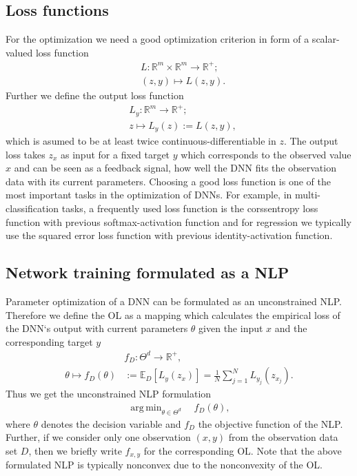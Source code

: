\documentclass[conference]{IEEEtran}
\DeclareMathOperator*{\argmin}{arg\,min}
\begin{document}
\subsection{Loss functions}
For the optimization we need a good optimization criterion in form of a scalar-valued loss function
\begin{align}
&L:\mathbb{R}^{m}\times \mathbb{R}^{m}\rightarrow \mathbb{R}^{+};\\
&(z, y)\mapsto L(z, y).
\end{align}
Further we define the output loss function
\begin{align}
&L_{y}:\mathbb{R}^{m}\rightarrow \mathbb{R}^{+};\\
&z\mapsto L_{y}(z) := L(z, y),
\end{align}
which is asumed to be at least twice continuous-differentiable in $z$. The output loss takes $z_{x}$ as input for a fixed target $y$ which corresponds to the observed value $x$ and can be seen as a feedback signal, how well the DNN fits the observation data with its current parameters. Choosing a good loss function is one of the most important tasks in the optimization of DNNs. For example, in multi-classification tasks, a frequently used loss function is the corssentropy loss function with previous softmax-activation function and for regression we typically use the squared error loss function with previous identity-activation function.

\subsection{Network training formulated as a NLP}
Parameter optimization of a DNN can be formulated as an unconstrained NLP. Therefore we define the OL as a mapping which calculates the empirical loss of the DNN`s output with current parameters $\theta$ given the input $x$ and the corresponding target $y$
\begin{align}
&f_{D}:\Theta^{d}\rightarrow\mathbb{R}^{+},\\
\theta\mapsto f_{D}(\theta) &:= \mathbb{E}_{D}[L_{y}(z_{x})] =  \frac{1}{N}\sum_{j = 1}^{N}L_{y_{j}}(z_{x_{j}}).
\end{align}
Thus we get the unconstrained NLP formulation
\begin{align}
\argmin_{\theta\in\Theta^{d}}\quad f_{D}(\theta),
\end{align}
where $\theta$ denotes the decision variable and $f_{D}$ the objective function of the NLP.
Further, if we consider only one observation $(x, y)$ from the observation data set $D$, then we briefly write  $f_{x, y}$ for the corresponding OL. Note that the above formulated NLP is typically nonconvex due to the nonconvexity of the OL.
\end{document}
